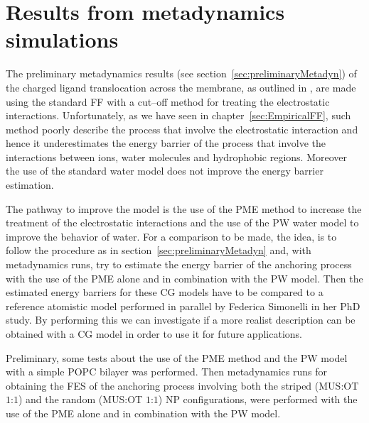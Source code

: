 \chapter{Results from metadynamics simulations}

The preliminary metadynamics results (see section~\ref{sec:preliminaryMetadyn}) of the charged ligand translocation across the membrane, as outlined in \cite{ourPaper}, are made using the standard \martini \ac{FF} with a cut--off method for treating the electrostatic interactions. Unfortunately, as we have seen in chapter~\ref{sec:EmpiricalFF}, such method poorly describe the process that involve the electrostatic interaction and hence it underestimates the energy barrier of the process that involve the interactions between ions, water molecules and hydrophobic regions. Moreover the use of the standard \martini water model does not improve the energy barrier estimation.

The pathway to improve the model is the use of the \ac{PME} method to increase the treatment of the electrostatic interactions and the use of the \ac{PW} water model to improve the behavior of water. For a comparison to be made, the idea, is to follow the procedure as in section~\ref{sec:preliminaryMetadyn} and, with metadynamics runs, try to estimate the energy barrier of the anchoring process with the use of the \ac{PME} alone and in combination with the \ac{PW} model. Then the estimated energy barriers for these \ac{CG} models have to be compared to a reference atomistic model performed in parallel by Federica Simonelli in her PhD study. By performing this we can investigate if a more realist description can be obtained with a \ac{CG} model in order to use it for future applications.

Preliminary, some tests about the use of the \ac{PME} method and the \ac{PW} model with a simple \ac{POPC} bilayer was performed. Then metadynamics runs for obtaining the \ac{FES} of the anchoring process involving both the striped (\ac{MUS}:\ac{OT} $1$:$1$) and the random (\ac{MUS}:\ac{OT} $1$:$1$) \ac{NP} configurations, were performed with the use of the \ac{PME} alone and in combination with the \ac{PW} model. 

